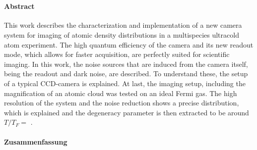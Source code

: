 \cleardoublepage
\thispagestyle{plain}

\makeatletter
\begin{center}
	\large\textbf{\@title}\\
	\normalsize\@author
\end{center}
\makeatother

\paragraph{Abstract}

This work describes the characterization and implementation of a new camera system for imaging of atomic density distributions in a multispecies ultracold atom experiment. The high quantum efficiency of the camera and its new readout mode, which allows for faster acquisition, are perfectly suited for scientific imaging. In this work, the noise sources that are induced from the camera itself, being the readout and dark noise, are described. To understand these, the setup of a typical CCD-camera is explained. At last, the imaging setup, including the magnification of an atomic cloud was tested on an ideal Fermi gas. The high resolution of the system and the noise reduction shows a precise distribution, which is explained and the degeneracy parameter is then extracted to be around $T/T_F=$ .

\begin{otherlanguage}{ngerman}

\paragraph{Zusammenfassung}

\lipsum[1-1]

\end{otherlanguage}
